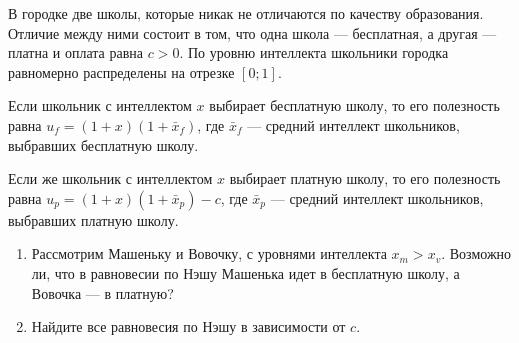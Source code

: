 \begin{problem}
В городке две школы, которые никак не отличаются по качеству образования. Отличие между ними состоит в том, что одна школа --- бесплатная, а другая --- платна и оплата равна $c>0$. По уровню интеллекта школьники городка равномерно распределены на отрезке $[0;1]$. \par
Если школьник с интеллектом $x$ выбирает бесплатную школу, то его полезность равна $u_{f}=(1+x)(1+\bar{x}_{f})$, где $\bar{x}_{f}$ --- средний интеллект школьников, выбравших бесплатную школу. \par
Если же школьник с интеллектом $x$ выбирает платную школу, то его полезность равна $u_{p}=(1+x)(1+\bar{x}_{p})-c$, где $\bar{x}_{p}$ --- средний интеллект школьников, выбравших платную школу. \par
\begin{enumerate}
\item Рассмотрим Машеньку и Вовочку, с уровнями интеллекта $x_{m}>x_{v}$. Возможно ли, что в равновесии по Нэшу Машенька идет в бесплатную школу, а Вовочка --- в платную? \par
\item Найдите все равновесия по Нэшу в зависимости от $c$.
\end{enumerate}



\end{problem}

